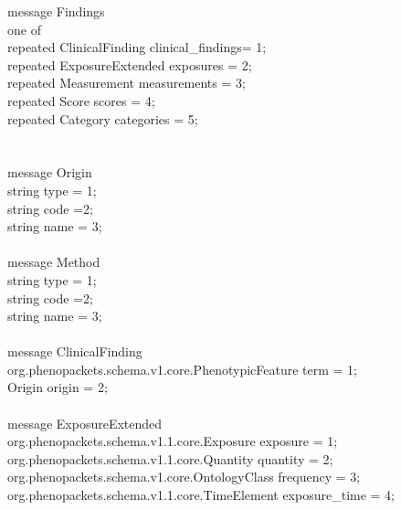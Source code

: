\documentclass[a4paper, 10pt]{article}
\begin{document}
message \colorbox{yellow!80}{Findings} \ { \\
    one of \ { \\
        repeated \colorbox{yellow!80}{ClinicalFinding} clinical\_findings= 1; \\
        repeated \colorbox{yellow!80}{ExposureExtended} exposures = 2; \\
        repeated \colorbox{yellow!80}{Measurement} measurements = 3; \\
        repeated \colorbox{yellow!80}{Score} scores = 4; \\
        repeated \colorbox{yellow!80}{Category} categories = 5; \\
   \ } \\
\ } \\






message \colorbox{yellow!80}{Origin} \ { \\
    string type = 1; \\
    string code =2; \\
    string name = 3; \\
\ } \\


message \colorbox{yellow!80}{Method} \ { \\
    string type = 1; \\
    string code =2; \\
    string name = 3; \\
\ } \\





message \colorbox{yellow!80}{ClinicalFinding} \ { \\
    org.phenopackets.schema.v1.core.PhenotypicFeature term = 1; \\
    \colorbox{yellow!80}{Origin} origin = 2; \\
\ } \\




message \colorbox{yellow!80}{ExposureExtended} \ { \\
    org.phenopackets.schema.v1.1.core.Exposure exposure = 1; \\
    org.phenopackets.schema.v1.1.core.Quantity quantity = 2; \\
    org.phenopackets.schema.v1.core.OntologyClass frequency = 3; \\
    org.phenopackets.schema.v1.1.core.TimeElement exposure\_time = 4; \\
\ } \\
\end{document}
